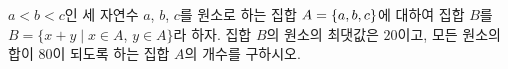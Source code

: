 $a<b<c$인 세 자연수 $a$, $b$, $c$를 원소로 하는 집합 $A=\{a{,}\mkern3mu\mathopen{}b{,}\mkern3mu\mathopen{}c\}$에 대하여 집합 $B$를 $B=\{x+y \mid x\in A$, $y\in A\}$라 하자. 집합 $B$의 원소의 최댓값은 $20$이고, 모든 원소의 합이 $80$이 되도록 하는 집합 $A$의 개수를 구하시오.
